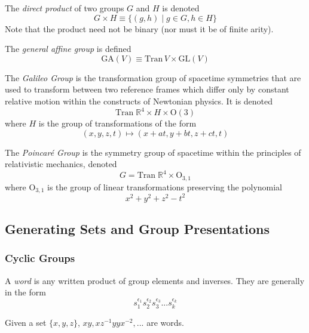 \documentclass{article}
\begin{document}
  \begin{definition}
    The \textit{direct product} of two groups $G$ and $H$ is denoted
    \[G \times H \equiv \{ (g, h)\;|\; g \in G, h \in H \} \]
    Note that the product need not be binary (nor must it be of finite arity). 
  \end{definition}

  \begin{definition}
    The \textit{general affine group} is defined 
    \[ \text{GA}(V) \equiv \text{Tran}\,V \times \text{GL}(V)\]
  \end{definition}

  \begin{definition}
    The \textit{Galileo Group} is the transformation group of spacetime symmetries that are used to transform between two reference frames which differ only by constant relative motion within the constructs of Newtonian physics. It is denoted 
    \[ \text{Tran}\;\mathbb{R}^{4} \times H \times \text{O} (3)\]
    where $H$ is the group of transformations of the form 
    \[ (x, y, z, t) \longmapsto (x+at, y+bt, z+ct, t)\]
  \end{definition}

  \begin{definition}
    The \textit{Poincaré Group} is the symmetry group of spacetime within the principles of relativistic mechanics, denoted
    \[ G = \text{Tran}\; \mathbb{R}^{4} \times \text{O}_{3,1}\]
    where O$_{3,1}$ is the group of linear transformations preserving the polynomial 
    \[ x^{2} + y^{2} + z^{2} - t^{2}\]
  \end{definition}

\subsection{Generating Sets and Group Presentations}

  \subsubsection{Cyclic Groups}

    \begin{definition}
      A \textit{word} is any written product of group elements and inverses. They are generally in the form
      \[s_{1}^{\epsilon_{1}} s_{2}^{\epsilon_{2}} s_{3}^{\epsilon_{3}}... s_{k}^{\epsilon_{k}}\]
    \end{definition}

    \begin{example}
      Given a set $\{x,y,z\}$, $x y, x z^{-1} y y x^{-2},...$ are words. 
    \end{example}
\end{document}

